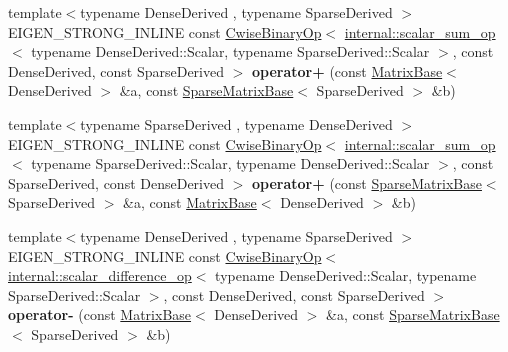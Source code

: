 \begin{DoxyCompactItemize}
{\footnotesize template$<$typename Dense\+Derived , typename Sparse\+Derived $>$ }\\E\+I\+G\+E\+N\+\_\+\+S\+T\+R\+O\+N\+G\+\_\+\+I\+N\+L\+I\+NE const \hyperlink{group___core___module_class_eigen_1_1_cwise_binary_op}{Cwise\+Binary\+Op}$<$ \hyperlink{struct_eigen_1_1internal_1_1scalar__sum__op}{internal\+::scalar\+\_\+sum\+\_\+op}$<$ typename Dense\+Derived\+::\+Scalar, typename Sparse\+Derived\+::\+Scalar $>$, const Dense\+Derived, const Sparse\+Derived $>$ {\bfseries operator+} (const \hyperlink{group___core___module_class_eigen_1_1_matrix_base}{Matrix\+Base}$<$ Dense\+Derived $>$ \&a, const \hyperlink{group___sparse_core___module_class_eigen_1_1_sparse_matrix_base}{Sparse\+Matrix\+Base}$<$ Sparse\+Derived $>$ \&b)
\item 
\mbox{\label{namespace_eigen_a584894a95468d0d022cea329e986acb1}} 
{\footnotesize template$<$typename Sparse\+Derived , typename Dense\+Derived $>$ }\\E\+I\+G\+E\+N\+\_\+\+S\+T\+R\+O\+N\+G\+\_\+\+I\+N\+L\+I\+NE const \hyperlink{group___core___module_class_eigen_1_1_cwise_binary_op}{Cwise\+Binary\+Op}$<$ \hyperlink{struct_eigen_1_1internal_1_1scalar__sum__op}{internal\+::scalar\+\_\+sum\+\_\+op}$<$ typename Sparse\+Derived\+::\+Scalar, typename Dense\+Derived\+::\+Scalar $>$, const Sparse\+Derived, const Dense\+Derived $>$ {\bfseries operator+} (const \hyperlink{group___sparse_core___module_class_eigen_1_1_sparse_matrix_base}{Sparse\+Matrix\+Base}$<$ Sparse\+Derived $>$ \&a, const \hyperlink{group___core___module_class_eigen_1_1_matrix_base}{Matrix\+Base}$<$ Dense\+Derived $>$ \&b)
\item 
\mbox{\label{namespace_eigen_a31b149ee95dc9c0cef509918960c9d49}} 
{\footnotesize template$<$typename Dense\+Derived , typename Sparse\+Derived $>$ }\\E\+I\+G\+E\+N\+\_\+\+S\+T\+R\+O\+N\+G\+\_\+\+I\+N\+L\+I\+NE const \hyperlink{group___core___module_class_eigen_1_1_cwise_binary_op}{Cwise\+Binary\+Op}$<$ \hyperlink{struct_eigen_1_1internal_1_1scalar__difference__op}{internal\+::scalar\+\_\+difference\+\_\+op}$<$ typename Dense\+Derived\+::\+Scalar, typename Sparse\+Derived\+::\+Scalar $>$, const Dense\+Derived, const Sparse\+Derived $>$ {\bfseries operator-\/} (const \hyperlink{group___core___module_class_eigen_1_1_matrix_base}{Matrix\+Base}$<$ Dense\+Derived $>$ \&a, const \hyperlink{group___sparse_core___module_class_eigen_1_1_sparse_matrix_base}{Sparse\+Matrix\+Base}$<$ Sparse\+Derived $>$ \&b)

\end{DoxyCompactItemize}

